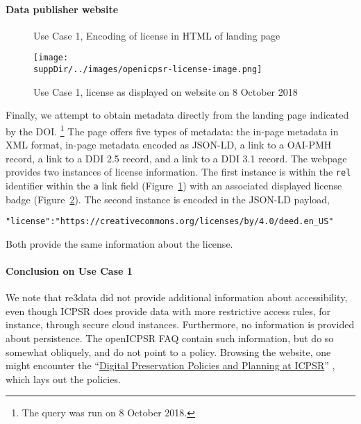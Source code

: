 \paragraph{Data publisher website}
\newcommand{\icpsrdate}{8 October 2018}
\begin{figure}
	
	\caption{Use Case 1, Encoding of license in HTML of landing page}
	\label{fig:case1:rela}
\end{figure}
\begin{figure}
	\centering
	\texttt{[image: \\suppDir/../images/openicpsr-license-image.png]}
	\caption{Use Case 1, license as displayed on website on \icpsrdate }
	\label{fig:case1:license}
\end{figure}
Finally, we attempt to obtain metadata   directly from the landing page indicated by the \ac{DOI}.%
\footnote{The query was run on \icpsrdate .}
The page offers five types of metadata: the in-page metadata in XML format, in-page metadata encoded as JSON-LD, a link to a OAI-PMH record, a link to a DDI 2.5 record, and a link to a DDI 3.1 record.
The webpage provides two instances of license information. The first instance is within the \texttt{rel} identifier within the \lstinline|a| link field (Figure~\ref{fig:case1:rela}) with an associated displayed  license badge (Figure~\ref{fig:case1:license}).
The second instance is encoded in the JSON-LD payload,
\begin{lstlisting}
"license":"https://creativecommons.org/licenses/by/4.0/deed.en_US"
\end{lstlisting}
Both provide the same information about the license.


\paragraph{Conclusion on Use Case 1}
We note that re3data did not provide additional information about  accessibility, even though ICPSR does provide data with more restrictive access rules, for instance, through secure cloud instances. Furthermore, no information is provided  about persistence. The openICPSR FAQ contain such information, but do so somewhat obliquely, and do not point to a policy. Browsing the website, one might encounter the ``\href{https://www.icpsr.umich.edu/icpsrweb/content/datamanagement/preservation/policies/index.html}{Digital Preservation Policies and Planning at ICPSR}'' \parencite{icpsr-preservation}, which  lays out the policies. 

